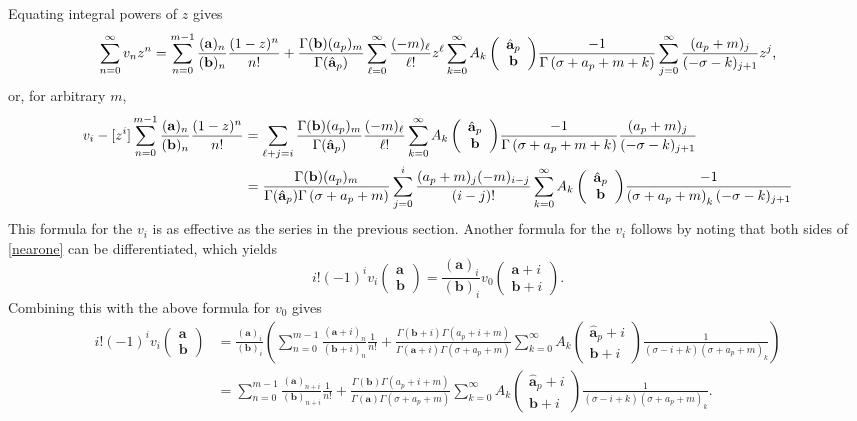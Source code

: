 \documentclass[10pt]{article}
\numberwithin{equation}{section}
\newcommand{\ARG}[2] {\left( \begin{array}{c} #1 \\ #2 \end{array} \right)}
\begin{document}
Equating integral powers of $z$ gives 
\begin{align*}
\sum_{n=0}^\infty v_nz^n=\sum_{n=0}^{m-1}{\frac{(\bold{a})_n}{(\bold{b})_n} \frac{(1-z)^n}{n!}}+\frac{\Gamma(\bold{b})(a_p)_m}{\Gamma(\hat{\bold{a}}_p)} \sum_{\ell=0}^\infty\frac{(-m)_\ell}{\ell!}z^\ell \sum_{k=0}^{\infty} {A_k\left(\begin{array}{c} \hat{\bold{a}}_p \\ \bold{b} \end{array}\right)} \frac{-1}{\Gamma
	\left(\sigma+a_p+m+k\right)} \sum_{j=0}^{\infty} \frac{(a_p+m)_j}{(-\sigma-k)_{j+1}} z^j\text{,}
\end{align*}
or, for arbitrary $m$,
\begin{align*}
v_i - [z^i] \sum_{n=0}^{m-1}{\frac{(\bold{a})_n}{(\bold{b})_n} \frac{(1-z)^n}{n!}} &= \sum_{\ell +j=i}\frac{\Gamma(\bold{b})(a_p)_m}{\Gamma(\hat{\bold{a}}_p)}\frac{(-m)_\ell}{\ell!}\sum_{k=0}^{\infty} {A_k\left(\begin{array}{c} \hat{\bold{a}}_p \\ \bold{b} \end{array}\right)} \frac{-1}{\Gamma
	\left(\sigma+a_p+m+k\right)}\frac{(a_p+m)_j}{(-\sigma-k)_{j+1}}\\
&= \frac{\Gamma(\bold{b}) (a_p)_m}{\Gamma(\hat{\bold{a}}_p) \Gamma\left(\sigma+a_p+m\right)} \sum_{j=0}^{i}\frac{(a_p+m)_j (-m)_{i-j}}{(i-j)!}\sum_{k=0}^{\infty} {A_k\left(\begin{array}{c} \hat{\bold{a}}_p \\ \bold{b} \end{array}\right)} \frac{-1}{\left(\sigma+a_p+m\right)_k (-\sigma-k)_{j+1}}
\end{align*}
This formula for the $v_i$ is as effective as the series in the previous section. Another formula for the $v_i$ follows by noting that both sides of \eqref{nearone} can be differentiated, which yields
\begin{equation*}
i! (-1)^i v_i \ARG{\mathbf{a}}{\mathbf{b}} = \frac{(\mathbf{a})_i}{(\mathbf{b})_i} v_0 \ARG{\mathbf{a}+i}{\mathbf{b}+i}\text{.}
\end{equation*}
Combining this with the above formula for $v_0$ gives
\begin{align*}
i! (-1)^i v_i \ARG{\mathbf{a}}{\mathbf{b}} &= \frac{(\mathbf{a})_i}{(\mathbf{b})_i} \left(  \sum_{n=0}^{m-1}{\frac{(\mathbf{a}+i)_n}{(\mathbf{b}+i)_n} \frac{1}{n!}} + \frac{\Gamma(\mathbf{b}+i) \Gamma(a_p+i+m)}{\Gamma(\mathbf{a}+i) \Gamma(\sigma+a_p+m)} \sum_{k=0}^{\infty} A_k \ARG{\hat{\mathbf{a}}_p+i}{\mathbf{b}+i} \frac{1}{(\sigma-i+k) (\sigma+a_p+m)_k} \right)\\
&=\sum_{n=0}^{m-1}{\frac{(\mathbf{a})_{n+i}}{(\mathbf{b})_{n+i}} \frac{1}{n!}} + \frac{\Gamma(\mathbf{b}) \Gamma(a_p+i+m)}{\Gamma(\mathbf{a}) \Gamma(\sigma+a_p+m)} \sum_{k=0}^{\infty} A_k \ARG{\hat{\mathbf{a}}_p+i}{\mathbf{b}+i} \frac{1}{(\sigma-i+k) (\sigma+a_p+m)_k}\text{.}
\end{align*}
\end{document}

